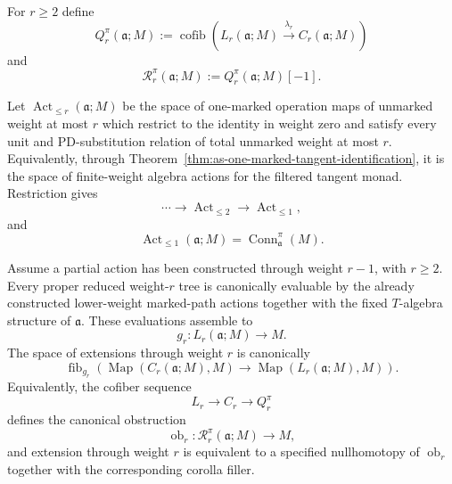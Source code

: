 \begin{definition}
\label{def:as-weight-relations}
For $r\geq2$ define
\[
\boxed{
    Q_r^\pi(\mathfrak a;M)
    :=
    \operatorname{cofib}
    \left(
        L_r(\mathfrak a;M)
        \xrightarrow{\lambda_r}
        C_r(\mathfrak a;M)
    \right)
}
\]
and
\[
\boxed{
    \mathcal R_r^\pi(\mathfrak a;M)
    :=
    Q_r^\pi(\mathfrak a;M)[-1].
}
\]
\end{definition}

\begin{definition}
\label{def:as-partial-representation-space}
Let $\operatorname{Act}_{\le r}(\mathfrak a;M)$ be the space of one-marked
operation maps of unmarked weight at most $r$ which restrict to the identity
in weight zero and satisfy every unit and PD-substitution relation of total
unmarked weight at most $r$.  Equivalently, through
Theorem~\ref{thm:as-one-marked-tangent-identification}, it is the space of
finite-weight algebra actions for the filtered tangent monad.  Restriction
gives
\[
    \cdots
    \longrightarrow
    \operatorname{Act}_{\le2}
    \longrightarrow
    \operatorname{Act}_{\le1},
\]
and
\[
\boxed{
    \operatorname{Act}_{\le1}(\mathfrak a;M)
    =
    \operatorname{Conn}_{\mathfrak a}^{\pi}(M).
}
\]
\end{definition}

\begin{theorem}
\label{thm:as-corolla-latching-extension}
Assume a partial action has been constructed through weight $r-1$, with
$r\ge2$.  Every proper reduced weight-$r$ tree is canonically evaluable by the
already constructed lower-weight marked-path actions together with the fixed
$T$-algebra structure of $\mathfrak a$.  These evaluations assemble to
\[
\boxed{
    g_r:
    L_r(\mathfrak a;M)
    \longrightarrow M.
}
\]
The space of extensions through weight $r$ is canonically
\[
\boxed{
    \operatorname{fib}_{g_r}
    \left(
        \operatorname{Map}(C_r(\mathfrak a;M),M)
        \longrightarrow
        \operatorname{Map}(L_r(\mathfrak a;M),M)
    \right).
}
\]
Equivalently, the cofiber sequence
\[
    L_r\longrightarrow C_r\longrightarrow Q_r^\pi
\]
defines the canonical obstruction
\[
\boxed{
    \operatorname{ob}_r:
    \mathcal R_r^\pi(\mathfrak a;M)
    \longrightarrow M,
}
\]
and extension through weight $r$ is equivalent to a specified nullhomotopy of
$\operatorname{ob}_r$ together with the corresponding corolla filler.
\end{theorem}

